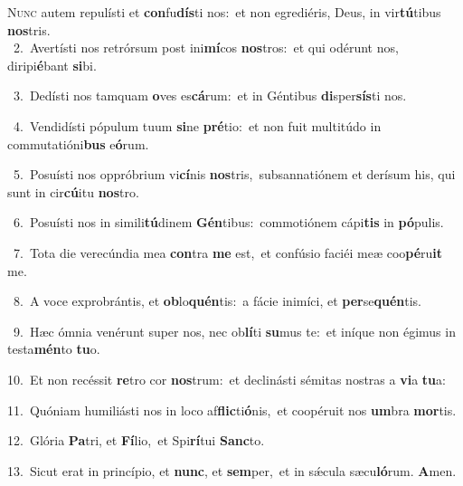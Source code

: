 \lettrine{\initial\textcolor{\initialcolor}{N}}{unc} autem repulísti et \textbf{con}\-fu\-\textbf{dís}\-ti nos:~\star et non egrediéris, Deus, in vir\-\textbf{tú}\-tibus \textbf{nos}\-tris.\\
{\numbfont\textcolor{\numbcolor}{~2.}}~Avertísti nos retrórsum post ini\-\textbf{mí}\-cos \textbf{nos}\-tros:~\star et qui odérunt nos, diripi\-\textbf{é}\-bant \textbf{si}\-bi.\par
{\numbfont\textcolor{\numbcolor}{~3.}}~Dedísti nos tamquam \textbf{o}\-ves es\-\textbf{cá}\-rum:~\star et in Géntibus \textbf{di}\-sper\-\textbf{sís}\-ti nos.\par
{\numbfont\textcolor{\numbcolor}{~4.}}~Vendidísti pópulum tuum \textbf{si}\-ne \textbf{pré}\-tio:~\star et non fuit multitúdo in commutatióni\textbf{bus} e\-\textbf{ó}\-rum.\par
{\numbfont\textcolor{\numbcolor}{~5.}}~Posuísti nos oppróbrium vi\-\textbf{cí}\-nis \textbf{nos}\-tris,~\star subsannatiónem et derísum his, qui sunt in cir\-\textbf{cú}\-itu \textbf{nos}\-tro.\par
{\numbfont\textcolor{\numbcolor}{~6.}}~Posuísti nos in simili\-\textbf{tú}\-dinem \textbf{Gén}\-tibus:~\star commotiónem cápi\textbf{tis} in \textbf{pó}\-pulis.\par
{\numbfont\textcolor{\numbcolor}{~7.}}~Tota die verecúndia mea \textbf{con}\-tra \textbf{me} est,~\star et confúsio faciéi meæ coo\-\textbf{pé}\-ru\textbf{it} me.\par
{\numbfont\textcolor{\numbcolor}{~8.}}~A voce exprobrántis, et \textbf{ob}\-lo\-\textbf{quén}\-tis:~\star a fácie inimíci, et \textbf{per}\-se\-\textbf{quén}\-tis.\par
{\numbfont\textcolor{\numbcolor}{~9.}}~Hæc ómnia venérunt super nos, nec ob\-\textbf{lí}\-ti \textbf{su}\-mus te:~\star et iníque non égimus in testa\-\textbf{mén}\-to \textbf{tu}\-o.\par
{\numbfont\textcolor{\numbcolor}{10.}}~Et non recéssit \textbf{re}\-tro cor \textbf{nos}\-trum:~\star et declinásti sémitas nostras a \textbf{vi}\-a \textbf{tu}\-a:\par
{\numbfont\textcolor{\numbcolor}{11.}}~Quóniam humiliásti nos in loco af\-\textbf{flic}\-ti\-\textbf{ó}\-nis,~\star et coopéruit nos \textbf{um}\-bra \textbf{mor}\-tis.\par
{\numbfont\textcolor{\numbcolor}{12.}}~Glória \textbf{Pa}\-tri, et \textbf{Fí}\-lio,~\star et Spi\-\textbf{rí}\-tui \textbf{Sanc}\-to.\par
{\numbfont\textcolor{\numbcolor}{13.}}~Sicut erat in princípio, et \textbf{nunc}\-, et \textbf{sem}\-per,~\star et in sǽcula sæcu\-\textbf{ló}\-rum. \textbf{A}\-men.\par
